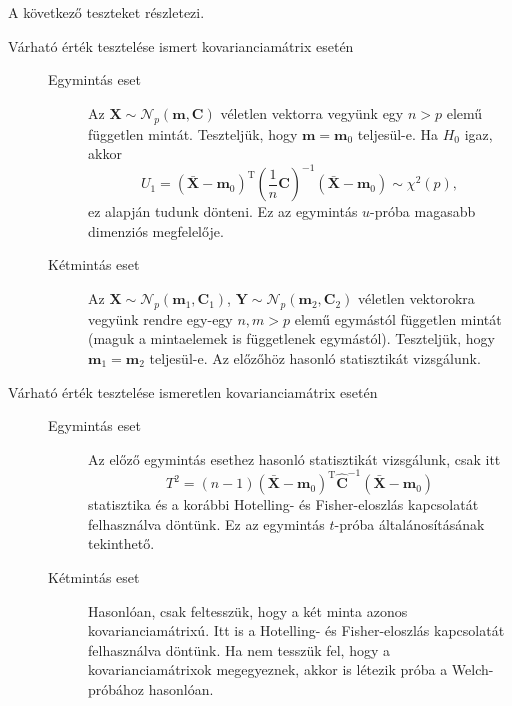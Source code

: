 \documentclass[DIV=15,appendixprefix]{scrreprt}
\theoremstyle{definition}
\theoremstyle{remark}
\newcommand{\normald}{\mathcal{N}}
\DeclareMathOperator{\T}{T}
\begin{document}
A következő teszteket \cite[5.~fejezet, 6.~szakasz, 230--234.~oldal]{BollaKramli} részletezi.
\begin{description}
	\item[Várható érték tesztelése ismert kovarianciamátrix esetén]\leavevmode
		\begin{description}
			\item[Egymintás eset] Az $ \mathbf{ X } \sim \normald_{ p } \left( \mathbf{ m },{}
				\mathbf{ C } \right) $ véletlen vektorra vegyünk egy $ n > p $ elemű független
				mintát. Teszteljük, hogy $ \mathbf{ m } = \mathbf{ m }_{ 0 } $ teljesül-e. Ha
				$ H_{ 0 } $ igaz, akkor
				\begin{equation*}
					U_{ 1 } = \left( \bar{ \mathbf{ X } } -
					\mathbf{ m }_{ 0 } \right)^{ \T } \left( \frac{ 1 }{ n } \mathbf{ C }
					\right)^{ - 1 } \left( \bar{ \mathbf{ X } } - \mathbf{ m }_{ 0 } \right) \sim
					\chi^{ 2 } \left( p \right),
				\end{equation*}
				ez alapján tudunk dönteni. Ez az egymintás
				$ u $-próba magasabb dimenziós megfelelője.
			\item[Kétmintás eset] Az $ \mathbf{ X } \sim \normald_{ p } \left( \mathbf{ m }_{ 1 },{}
				\mathbf{ C }_{ 1 } \right) $, $ \mathbf{ Y } \sim \normald_{ p } \left(
				\mathbf{ m }_{ 2 },{} \mathbf{ C }_{ 2 } \right) $ véletlen vektorokra vegyünk
				rendre egy-egy $ n,{} m > p $ elemű egymástól független mintát (maguk a mintaelemek
				is függetlenek egymástól). Teszteljük, hogy $ \mathbf{ m }_{ 1 } =
				\mathbf{ m }_{ 2 } $ teljesül-e. Az előzőhöz hasonló statisztikát vizsgálunk.
		\end{description}
	\item[Várható érték tesztelése ismeretlen kovarianciamátrix esetén]\leavevmode
		\begin{description}
			\item[Egymintás eset] Az előző egymintás esethez hasonló statisztikát vizsgálunk, csak
			itt
			\begin{equation*}
				T^{ 2 } = \left( n - 1 \right) \left( \bar{ \mathbf{ X } } -
				\mathbf{ m }_{ 0 } \right)^{ \T } \hat{ \mathbf{ C } }^{ - 1 } \left( \bar{
				\mathbf{ X } } - \mathbf{ m }_{ 0 } \right)
			\end{equation*}
			statisztika és a korábbi Hotelling- és Fisher-eloszlás kapcsolatát felhasználva döntünk.
			Ez az egymintás $ t $-próba általánosításának tekinthető.
			\item[Kétmintás eset] Hasonlóan, csak feltesszük, hogy a két minta azonos
			kovarianciamátrixú. Itt is a Hotelling- és Fisher-eloszlás kapcsolatát felhasználva
			döntünk. Ha nem tesszük fel, hogy a kovarianciamátrixok megegyeznek, akkor is létezik
			próba a Welch-próbához hasonlóan.
		\end{description}
\end{description}
%
\end{document}
